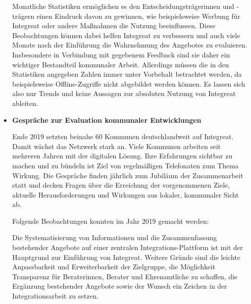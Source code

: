 \documentclass[12pt, a4paper]{article} %
\begin{document}
\begin{itemize}
Monatliche Statistiken ermöglichen es den Entscheidungsträgerinnen und
-trägern einen Eindruck davon zu gewinnen, wie beispielsweise Werbung
für Integreat oder andere Maßnahmen die Nutzung beeinflussen. Diese
Beobachtungen können dabei helfen Integreat zu verbessern und auch viele
Monate nach der Einführung die Wahrnehmung des Angebotes zu evaluieren.
Insbesondere in Verbindung mit gegebenem Feedback sind sie daher ein
wichtiger Bestandteil kommunaler Arbeit. Allerdings müssen die in den
Statistiken angegeben Zahlen immer unter Vorbehalt betrachtet werden, da
beispielsweise Offline-Zugriffe nicht abgebildet werden können. Es
lassen sich also nur Trends und keine Aussagen zur absoluten Nutzung von
Integreat ableiten.

\item  \textbf{Gespräche zur Evaluation kommunaler Entwicklungen}

Ende 2019 setzten beinahe 60 Kommunen deutschlandweit auf Integreat.
Damit wächst das Netzwerk stark an. Viele Kommunen arbeiten seit
mehreren Jahren mit der digitalen Lösung. Ihre Erfahrungen sichtbar zu
machen und zu bündeln ist Ziel von regelmäßigen Telefonaten zum Thema
Wirkung. Die Gespräche finden jährlich zum Jubiläum der Zusammenarbeit
statt und decken Fragen über die Erreichung der vorgenommenen Ziele,
aktuelle Herausforderungen und Wirkungen aus lokaler, kommunaler Sicht
ab.

Folgende Beobachtungen konnten im Jahr 2019 gemacht werden:

Die Systematisierung von Informationen und die Zusammenfassung
bestehender Angebote auf einer zentralen Integrations-Plattform ist mit
der Hauptgrund zur Einführung von Integreat. Weitere Gründe sind die
leichte Anpassbarkeit und Erweiterbarkeit der Zielgruppe, die
Möglichkeit Transparenz für Beraterinnen, Berater und Ehrenamtliche zu
schaffen, die Ergänzung bestehender Angebote sowie der Wunsch ein
Zeichen in der Integrationsarbeit zu setzen.


\end{itemize}
\end{document}
